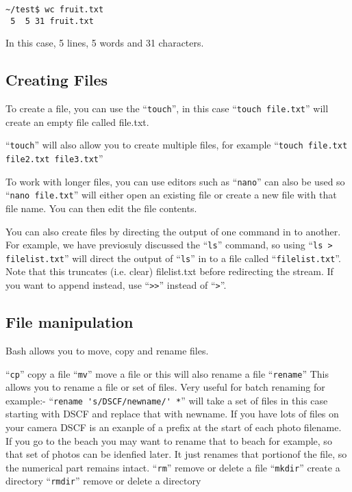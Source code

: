 \documentclass{extbook}
\begin{document}
\begin{verbatim}
~/test$ wc fruit.txt 
 5  5 31 fruit.txt
\end{verbatim}

In this case,  5 lines, 5 words and 31 characters. 


\subsection{Creating Files}

To create a file, you can use the ``\verb|touch|'', in this case ``\verb|touch file.txt|'' will create an empty file called file.txt.

``\verb|touch|'' will also allow you to create multiple files, for example ``\verb|touch file.txt file2.txt file3.txt|''

To work with longer files, you can use editors such as ``\verb|nano|'' can also be used so ``\verb|nano file.txt|'' will either open an existing file or create a new file with that file name.   You can then edit the file contents.

You can also create files by directing the output of one command in to another.  For example, we have previosuly discussed the ``\verb|ls|'' command, so using ``\verb|ls > filelist.txt|'' will direct the output of ``\verb|ls|'' in to a file called ``\verb|filelist.txt|''.  Note that this truncates (i.e. clear) filelist.txt before redirecting the stream.  If you want to append instead, use ``\verb|>>|'' instead of ``\verb|>|''.


\subsection{File manipulation}

Bash allows you to move, copy and rename files.   

``\verb|cp|'' copy a file
``\verb|mv|'' move a file or this will also rename a file
``\verb|rename|'' This allows you to rename a file or set of files.  Very useful for batch renaming for example:-
``\verb|rename 's/DSCF/newname/' *|'' will take a set of files in this case starting with DSCF and replace that with newname.  If you have lots of files on your camera DSCF is an exanple of a prefix at the start of each photo filename.   If you go to the beach you may want to rename that to beach for example, so that set of photos can be idenfied later.   It just renames that portionof the file, so the numerical part remains intact.  
``\verb|rm|'' remove or delete a file
``\verb|mkdir|'' create a directory
``\verb|rmdir|'' remove or delete a directory
\end{document}

